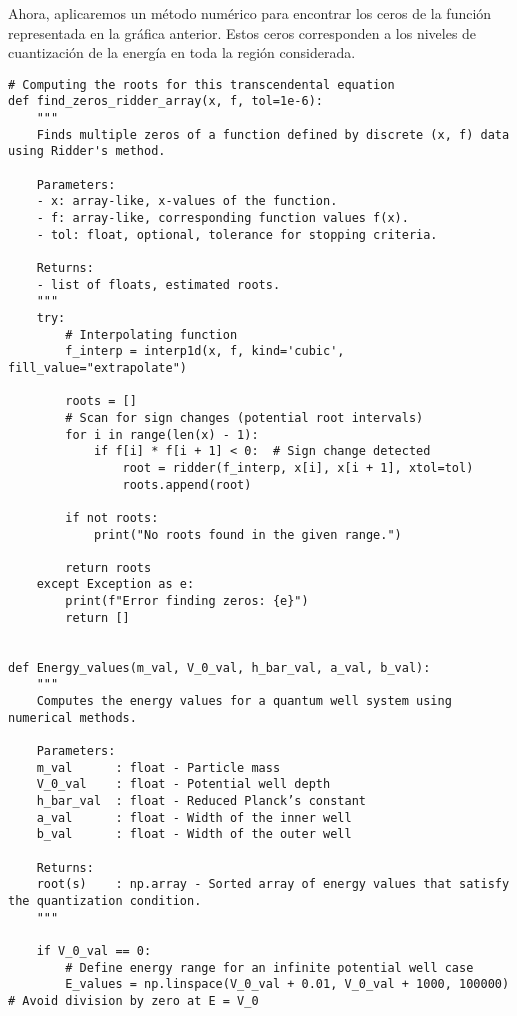 \documentclass[11pt]{article}
\begin{document}
\begin{center}

\end{center}

Ahora, aplicaremos un método numérico para encontrar los ceros de la
función representada en la gráfica anterior. Estos ceros corresponden a
los niveles de cuantización de la energía en toda la región considerada.

\begin{verbatim}
# Computing the roots for this transcendental equation
def find_zeros_ridder_array(x, f, tol=1e-6):
    """
    Finds multiple zeros of a function defined by discrete (x, f) data using Ridder's method.

    Parameters:
    - x: array-like, x-values of the function.
    - f: array-like, corresponding function values f(x).
    - tol: float, optional, tolerance for stopping criteria.

    Returns:
    - list of floats, estimated roots.
    """
    try:
        # Interpolating function
        f_interp = interp1d(x, f, kind='cubic', fill_value="extrapolate")

        roots = []
        # Scan for sign changes (potential root intervals)
        for i in range(len(x) - 1):
            if f[i] * f[i + 1] < 0:  # Sign change detected
                root = ridder(f_interp, x[i], x[i + 1], xtol=tol)
                roots.append(root)

        if not roots:
            print("No roots found in the given range.")

        return roots
    except Exception as e:
        print(f"Error finding zeros: {e}")
        return []


def Energy_values(m_val, V_0_val, h_bar_val, a_val, b_val):
    """
    Computes the energy values for a quantum well system using numerical methods.

    Parameters:
    m_val      : float - Particle mass
    V_0_val    : float - Potential well depth
    h_bar_val  : float - Reduced Planck’s constant
    a_val      : float - Width of the inner well
    b_val      : float - Width of the outer well

    Returns:
    root(s)    : np.array - Sorted array of energy values that satisfy the quantization condition.
    """

    if V_0_val == 0:
        # Define energy range for an infinite potential well case
        E_values = np.linspace(V_0_val + 0.01, V_0_val + 1000, 100000)  # Avoid division by zero at E = V_0


\end{verbatim}
\end{document}
